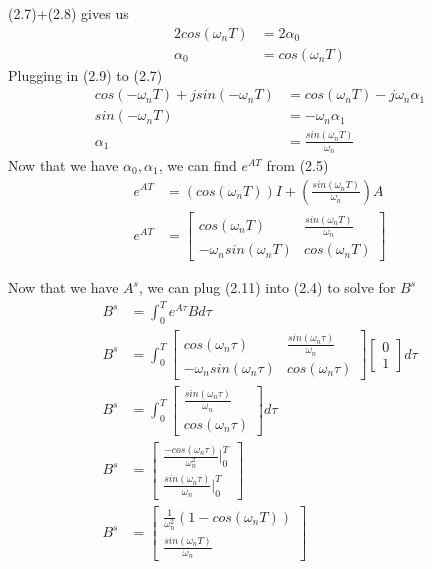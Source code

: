 \documentclass{article}
\begin{document}
  (2.7)+(2.8) gives us 
  \begin{align*}
	  2cos(\omega_nT)&=2\alpha_0 \\
	  \alpha_0&=cos(\omega_nT) \tag{2.9}
  \end{align*}
  Plugging in (2.9) to (2.7)
  \begin{align*}
	  cos(-\omega_nT)+jsin(-\omega_nT)&=cos(\omega_nT)-j\omega_n\alpha_1 \\
	  sin(-\omega_nT)&=-\omega_n\alpha_1 \\
	  \alpha_1&=\frac{sin(\omega_nT)}{\omega_n} \tag{2.10}
  \end{align*}
  Now that we have $\alpha_0, \alpha_1$, we can find $e^{AT}$ from (2.5)
  \begin{align*}
	  e^{AT}&=(cos(\omega_nT))I+(\frac{sin(\omega_nT)}{\omega_n})A \\
	  e^{AT}&=
	  \begin{bmatrix}
		  cos(\omega_nT) & \frac{sin(\omega_nT)}{\omega_n} \\
		  -\omega_nsin(\omega_nT) & cos(\omega_nT) \tag{2.11}
	  \end{bmatrix}
  \end{align*}

  Now that we have $A^s$, we can plug (2.11) into (2.4) to solve for $B^s$
  \begin{align*}
	  B^s&=\int_0^Te^{A\tau}Bd\tau \\ 
	  B^s&=\int_0^T
	  \begin{bmatrix}
		  cos(\omega_n\tau) & \frac{sin(\omega_n\tau)}{\omega_n} \\
		  -\omega_nsin(\omega_n\tau) & cos(\omega_n\tau)
	  \end{bmatrix}
	  \begin{bmatrix}
		  0 \\
		  1
	  \end{bmatrix}d\tau \\
	  B^s&=\int_0^T
	  \begin{bmatrix}
		  \frac{sin(\omega_n\tau)}{\omega_n} \\
		  cos(\omega_n\tau)
	  \end{bmatrix}d\tau \\
	  B^s&=
	  \begin{bmatrix}
		  \frac{-cos(\omega_n\tau)}{\omega_n^2}\rvert_0^T \\
		  \frac{sin(\omega_n\tau)}{\omega_n}\rvert_0^T
	  \end{bmatrix} \\
	  B^s&=
	  \begin{bmatrix}
		  \frac{1}{\omega_n^2}(1-cos(\omega_nT)) \\
		  \frac{sin(\omega_nT)}{\omega_n} \tag{2.12}
	  \end{bmatrix} 
  \end{align*}
  
\end{document}
